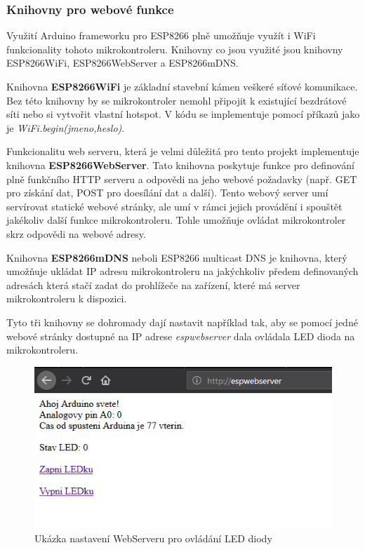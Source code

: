 \subsubsection{Knihovny pro webové funkce}

Využití Arduino frameworku pro ESP8266 plně umožňuje využít i WiFi funkcionality tohoto mikrokontroleru. Knihovny co jsou využité jsou knihovny ESP8266WiFi, ESP8266WebServer a ESP8266mDNS.

Knihovna \textbf{ESP8266WiFi} je základní stavební kámen veškeré síťové komunikace. Bez této knihovny by se mikrokontroler nemohl připojit k existující bezdrátové síti nebo si vytvořit vlastní hotspot. V kódu se implementuje pomocí příkazů jako je \textit{WiFi.begin(jmeno,heslo)}.

Funkcionalitu web serveru, která je velmi důležitá pro tento projekt implementuje knihovna \textbf{ESP8266WebServer}. Tato knihovna poskytuje funkce pro definování plně funkčního HTTP serveru a odpovědi na jeho webové požadavky (např. GET pro získání dat, POST pro doesílání dat a další). Tento webový server umí servírovat statické webové stránky, ale umí v rámci jejich provádění i spouštět jakékoliv další funkce mikrokontroleru. Tohle umožňuje ovládat mikrokontroler skrz odpovědi na webové adresy.

Knihovna \textbf{ESP8266mDNS} neboli ESP8266 multicast DNS je knihovna, který umožňuje ukládat IP adresu mikrokontroleru na jakýchkoliv předem definovaných adresách která stačí zadat do prohlížeče na zařízení, které má server mikrokontroleru k dispozici.

Tyto tři knihovny se dohromady dají nastavit například tak, aby se pomocí jedné webové stránky dostupné na IP adrese \textit{espwebserver} dala ovládala LED dioda na mikrokontroleru.

\begin{figure}[H]
	\centering
	\includegraphics[width=0.7\linewidth]{images/ESPWebserverUkazka}
	\caption{Ukázka nastavení WebServeru pro ovládání LED diody \cite{NavodNaESPWebServerDratek}}
	\label{fig:espwebserverukazka}
\end{figure}

